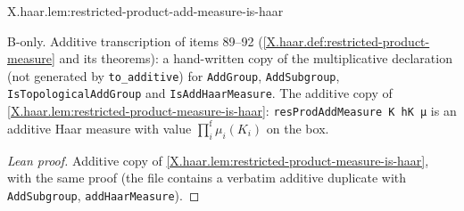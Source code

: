 \begin{tfformal}{X.haar.lem:restricted-product-add-measure-is-haar}
\begin{tffidelity}
B-only. Additive transcription of items 89--92 (\cref{X.haar.def:restricted-product-measure} and its theorems): a hand-written copy of the multiplicative declaration (not generated by \texttt{to\_additive}) for \texttt{AddGroup}, \texttt{AddSubgroup}, \texttt{IsTopologicalAddGroup} and \texttt{IsAddHaarMeasure}. The additive copy of \cref{X.haar.lem:restricted-product-measure-is-haar}: \texttt{resProdAddMeasure K hK μ} is an additive Haar measure with value $\prod^{\mathrm f}_i\mu_i(K_i)$ on the box.
\end{tffidelity}
\end{tfformal}
\begin{proof}[Lean proof]
Additive copy of \cref{X.haar.lem:restricted-product-measure-is-haar}, with the same proof (the file contains a verbatim additive duplicate with \texttt{AddSubgroup}, \texttt{addHaarMeasure}).
\end{proof}

